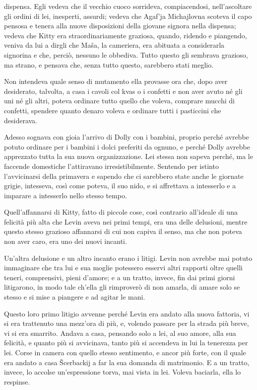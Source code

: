 dispensa. Egli vedeva che il vecchio cuoco sorrideva, compiacendosi, nell'ascoltare gli ordini di lei, inesperti, assurdi; vedeva che Agaf'ja Michajlovna scoteva il capo pensosa e tenera alla nuove disposizioni della giovane signora nella dispensa; vedeva che Kitty era straordinariamente graziosa, quando, ridendo e piangendo, veniva da lui a dirgli che Maša, la cameriera, era abituata a considerarla signorina e che, perciò, nessuno le obbediva. Tutto questo gli sembrava grazioso, ma strano, e pensava che, senza tutto questo, sarebbero stati meglio. 

Non intendeva quale senso di mutamento ella provasse ora che, dopo aver desiderato, talvolta, a casa i cavoli col kvas o i confetti e non aver avuto né gli uni né gli altri, poteva ordinare tutto quello che voleva, comprare mucchi di confetti, spendere quanto denaro voleva e ordinare tutti i pasticcini che desiderava. 

Adesso sognava con gioia l'arrivo di Dolly con i bambini, proprio perché avrebbe potuto ordinare per i bambini i dolci preferiti da ognuno, e perché Dolly avrebbe apprezzato tutta la sua nuova organizzazione. Lei stessa non sapeva perché, ma le faccende domestiche l'attiravano irresistibilmente. Sentendo per istinto l'avvicinarsi della primavera e sapendo che ci sarebbero state anche le giornate grigie, intesseva, così come poteva, il suo nido, e si affrettava a intesserlo e a imparare a intesserlo nello stesso tempo. 

Quell'affannarsi di Kitty, fatto di piccole cose, così contrario all'ideale di una felicità più alta che Levin aveva nei primi tempi, era una delle delusioni, mentre questo stesso grazioso affannarsi di cui non capiva il senso, ma che non poteva non aver caro, era uno dei nuovi incanti. 

Un'altra delusione e un altro incanto erano i litigi. Levin non avrebbe mai potuto immaginare che tra lui e sua moglie potessero esservi altri rapporti oltre quelli teneri, comprensivi, pieni d'amore; e a un tratto, invece, fin dai primi giorni litigarono, in modo tale ch'ella gli rimproverò di non amarla, di amare solo se stesso e si mise a piangere e ad agitar le mani. 

Questo loro primo litigio avvenne perché Levin era andato alla nuova fattoria, vi si era trattenuto una mezz'ora di più, e, volendo passare per la strada più breve, vi si era smarrito. Andava a casa, pensando solo a lei, al suo amore, alla sua felicità, e quanto più si avvicinava, tanto più si accendeva in lui la tenerezza per lei. Corse in camera con quello stesso sentimento, e ancor più forte, con il quale era andato a casa Šcerbackij a far la sua domanda di matrimonio. E a un tratto, invece, lo accolse un'espressione torva, mai vista in lei. Voleva baciarla, ella lo respinse. 

